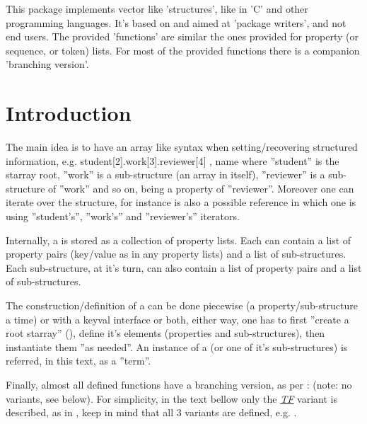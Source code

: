 \documentclass[10pt]{article}
\begin{document}
  
\begin{typesetabstract}

This package implements vector like 'structures', like in 'C' and other programming languages. 
It's based on  and aimed at 'package writers', and not end users. The provided 'functions' are similar the ones provided for property (or sequence, or token) lists. For most of the provided functions there is a companion 'branching version'.

\end{typesetabstract}

\tableofcontents

\section{Introduction}
The main idea is to have an array like syntax when setting/recovering structured information, e.g.  {student[2].work[3].reviewer[4] , name} where ''student'' is the starray root, ''work'' is a sub-structure (an array in itself), ''reviewer'' is a sub-structure of ''work'' and so on,  being a property of ''reviewer''. Moreover one can iterate over the structure, for instance  is also a possible reference in which one is using ''student's'', ''work's'' and ''reviewer's'' iterators.

Internally, a  is stored as a collection of property lists. Each  can contain a list of property pairs (key/value as in any  property lists) and a list of sub-structures. Each sub-structure, at it's turn, can also contain a list of property pairs and a list of sub-structures. 

The construction/definition of a  can be done piecewise (a property/sub-structure a time) or with a keyval interface or both, either way, one has to first ''create a root starray'' (), define it's elements (properties and sub-structures), then instantiate them ''as needed''. An instance of a  (or one of it's sub-structures) is referred, in this text, as a ''term''.

Finally, almost all defined functions have a branching version, as per :  (note: no  variants, see below). For simplicity, in the text bellow only the \underline{\textsl{TF}} variant is described, as in , keep in mind that all 3 variants are defined, e.g. .
\end{document}
